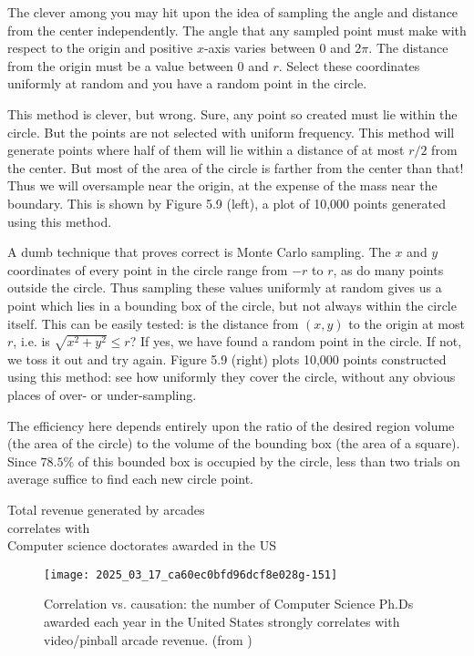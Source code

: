 \documentclass[10pt]{article}
\begin{document}
The clever among you may hit upon the idea of sampling the angle and distance from the center independently. The angle that any sampled point must make with respect to the origin and positive $x$-axis varies between 0 and $2 \pi$. The distance from the origin must be a value between 0 and $r$. Select these coordinates uniformly at random and you have a random point in the circle.

This method is clever, but wrong. Sure, any point so created must lie within the circle. But the points are not selected with uniform frequency. This method will generate points where half of them will lie within a distance of at most $r / 2$ from the center. But most of the area of the circle is farther from the center than that! Thus we will oversample near the origin, at the expense of the mass near the boundary. This is shown by Figure 5.9 (left), a plot of 10,000 points generated using this method.

A dumb technique that proves correct is Monte Carlo sampling. The $x$ and $y$ coordinates of every point in the circle range from $-r$ to $r$, as do many points outside the circle. Thus sampling these values uniformly at random gives us a point which lies in a bounding box of the circle, but not always within the circle itself. This can be easily tested: is the distance from $(x, y)$ to the origin at most $r$, i.e. is $\sqrt{x^{2}+y^{2}} \leq r$? If yes, we have found a random point in the circle. If not, we toss it out and try again. Figure 5.9 (right) plots 10,000 points constructed using this method: see how uniformly they cover the circle, without any obvious places of over- or under-sampling.

The efficiency here depends entirely upon the ratio of the desired region volume (the area of the circle) to the volume of the bounding box (the area of a square). Since $78.5 \%$ of this bounded box is occupied by the circle, less than two trials on average suffice to find each new circle point.


Total revenue generated by arcades\\
correlates with\\
Computer science doctorates awarded in the US\\
\begin{figure}[h]
\centering
\texttt{[image: 2025\_03\_17\_ca60ec0bfd96dcf8e028g-151]}
\caption{Correlation vs. causation: the number of Computer Science Ph.Ds awarded each year in the United States strongly correlates with video/pinball arcade revenue. (from \cite{Vig15})}
\end{figure}
\end{document}
